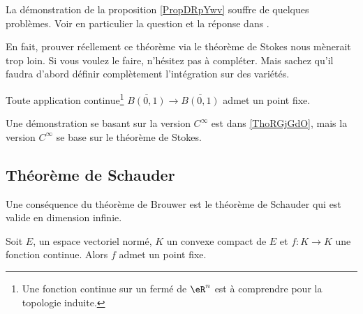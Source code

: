 \begin{probleme}    \label{PROBooSSOBooCsovCy}
	La démonstration de la proposition \ref{PropDRpYwv} souffre de quelques problèmes. Voir en particulier la question et la réponse dans \cite{BIBooIDAGooAbmLcf}.

	En fait, prouver réellement ce théorème via le théorème de Stokes nous mènerait trop loin. Si vous voulez le faire, n'hésitez pas à compléter. Mais sachez qu'il faudra d'abord définir complètement l'intégration sur des variétés.
\end{probleme}

\begin{theorem}		\label{THOooZMUAooSPlqUx}
	Toute application continue\footnote{Une fonction continue sur un fermé de \( \eR^n\) est à comprendre pour la topologie induite.} \( \overline{B(0,1)}  \to \overline{B(0,1)}\) admet un point fixe.
\end{theorem}
Une démonstration se basant sur la version \( C^{\infty}\) est dans \ref{ThoRGjGdO}, mais la version $C^{\infty}$ se base sur le théorème de Stokes.


\subsection{Théorème de Schauder}

Une conséquence du théorème de Brouwer est le théorème de Schauder qui est valide en dimension infinie.

\begin{theorem}       \label{ThovHJXIU}
	Soit \( E\), un espace vectoriel normé, \( K\) un convexe compact de \( E\) et \( f\colon K\to K\) une fonction continue. Alors \( f\) admet un point fixe.
\end{theorem}

